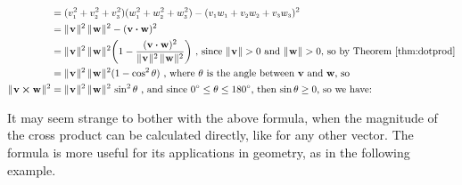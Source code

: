 \begin{align*}
  &= (v_{\scriptscriptstyle 1}^{2} + v_{\scriptscriptstyle 2}^{2} + v_{\scriptscriptstyle 3}^{2})(w_{\scriptscriptstyle 1}^{2} + w_{\scriptscriptstyle 2}^{2} + w_{\scriptscriptstyle 3}^{2}) -
   (v_{\scriptscriptstyle 1}w_{\scriptscriptstyle 1} + v_{\scriptscriptstyle 2}w_{\scriptscriptstyle 2} + v_{\scriptscriptstyle 3}w_{\scriptscriptstyle 3})^2\\
  &= \lVert\mspace{1mu}\textbf{v}\mspace{1mu}\rVert^2 \, \lVert\mspace{1mu}\textbf{w}\mspace{1mu}\rVert^2 - (\textbf{v} \bm{\cdot} \textbf{w})^2\\
  &= \lVert\mspace{1mu}\textbf{v}\mspace{1mu}\rVert^2 \, \lVert\mspace{1mu}\textbf{w}\mspace{1mu}\rVert^2 \biggl( 1 -
   \frac{(\textbf{v} \bm{\cdot} \textbf{w})^2}{\lVert\mspace{1mu}\textbf{v}\mspace{1mu}\rVert^2 \, \lVert\mspace{1mu}\textbf{w}\mspace{1mu}\rVert^2} \biggr)
   \text{~,~since $\lVert\mspace{1mu}\textbf{v}\mspace{1mu}\rVert > 0$ and $\lVert\mspace{1mu}\textbf{w}\mspace{1mu}\rVert > 0$, so by Theorem \ref{thm:dotprod}}\\
  &= \lVert\mspace{1mu}\textbf{v}\mspace{1mu}\rVert^2 \, \lVert\mspace{1mu}\textbf{w}\mspace{1mu}\rVert^2 (1 - \cos^2 \theta)
  \text{~,~where $\theta$ is the angle between \textbf{v} and \textbf{w}, so}\\
  \lVert\mspace{1mu}\textbf{v} \bm{\times} \textbf{w}\mspace{1mu}\rVert^2 &= \lVert\mspace{1mu}\textbf{v}\mspace{1mu}\rVert^2 \, \lVert\mspace{1mu}\textbf{w}\mspace{1mu}\rVert^2 \, \sin^2 \theta
  \text{~,~and since $0^\circ \le \theta \le 180^\circ$, then $\sin \theta \ge 0$, so we have:}
\end{align*}
\vspace{2mm}

It may seem strange to bother with the above formula, when the magnitude of the cross product can be calculated
directly, like for any other vector. The formula is more useful for its applications in geometry, as in the
following example.

